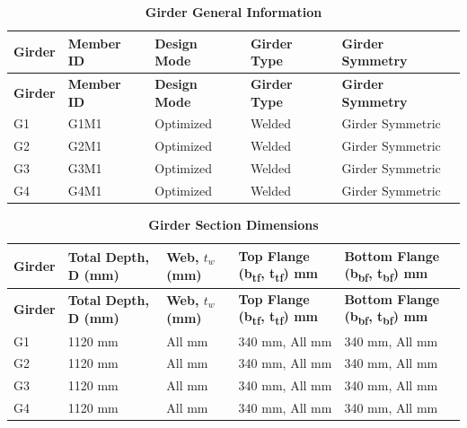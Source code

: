 \documentclass[12pt,a4paper]{report}
\numberwithin{table}{chapter}
\numberwithin{figure}{chapter}
\begin{document}
\newpage

\vspace{0.4em}
\noindent
            
\vspace{4pt}
\begin{longtable}{|L{2.2cm}|L{1.8cm}|p{3.8cm}|p{3.8cm}|p{3.8cm}|}
\caption{\textbf{Girder General Information}}
\hline
\textbf{Girder} & \textbf{Member ID} & \textbf{Design Mode} & \textbf{Girder Type} & \textbf{Girder Symmetry} \\[6pt]
\hline
\endfirsthead
\textbf{Girder} & \textbf{Member ID} & \textbf{Design Mode} & \textbf{Girder Type} & \textbf{Girder Symmetry} \\[6pt]
\hline
\endhead
G1 & G1M1 & Optimized & Welded & Girder Symmetric \\[8pt]
\hline
G2 & G2M1 & Optimized & Welded & Girder Symmetric \\[8pt]
\hline
G3 & G3M1 & Optimized & Welded & Girder Symmetric \\[8pt]
\hline
G4 & G4M1 & Optimized & Welded & Girder Symmetric \\[8pt]
\hline
\end{longtable}

\vspace{0.6em}

\vspace{4pt}
\begin{longtable}{|L{1.8cm}|L{2.3cm}|L{1.8cm}|p{4.8cm}|p{4.8cm}|}
\caption{\textbf{Girder Section Dimensions}}
\hline
\textbf{Girder} & \textbf{Total Depth, D (mm)} & \textbf{Web, $t_w$ (mm)} & \textbf{Top Flange (b\textsubscript{tf}, t\textsubscript{tf}) mm} & \textbf{Bottom Flange (b\textsubscript{bf}, t\textsubscript{bf}) mm} \\[6pt]
\hline
\endfirsthead
\textbf{Girder} & \textbf{Total Depth, D (mm)} & \textbf{Web, $t_w$ (mm)} & \textbf{Top Flange (b\textsubscript{tf}, t\textsubscript{tf}) mm} & \textbf{Bottom Flange (b\textsubscript{bf}, t\textsubscript{bf}) mm} \\[6pt]
\hline
\endhead
G1 & 1120 mm & All mm & 340 mm, All mm & 340 mm, All mm \\[8pt]
\hline
G2 & 1120 mm & All mm & 340 mm, All mm & 340 mm, All mm \\[8pt]
\hline
G3 & 1120 mm & All mm & 340 mm, All mm & 340 mm, All mm \\[8pt]
\hline
G4 & 1120 mm & All mm & 340 mm, All mm & 340 mm, All mm \\[8pt]
\hline
\end{longtable}
\end{document}

